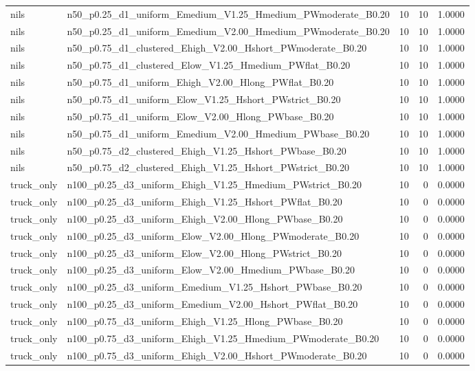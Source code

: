 \begin{tabular}{llrrr}
nils & n50_p0.25_d1_uniform_Emedium_V1.25_Hmedium_PWmoderate_B0.20 & 10 & 10 & 1.0000 \\
nils & n50_p0.25_d1_uniform_Emedium_V2.00_Hmedium_PWmoderate_B0.20 & 10 & 10 & 1.0000 \\
nils & n50_p0.75_d1_clustered_Ehigh_V2.00_Hshort_PWmoderate_B0.20 & 10 & 10 & 1.0000 \\
nils & n50_p0.75_d1_clustered_Elow_V1.25_Hmedium_PWflat_B0.20 & 10 & 10 & 1.0000 \\
nils & n50_p0.75_d1_uniform_Ehigh_V2.00_Hlong_PWflat_B0.20 & 10 & 10 & 1.0000 \\
nils & n50_p0.75_d1_uniform_Elow_V1.25_Hshort_PWstrict_B0.20 & 10 & 10 & 1.0000 \\
nils & n50_p0.75_d1_uniform_Elow_V2.00_Hlong_PWbase_B0.20 & 10 & 10 & 1.0000 \\
nils & n50_p0.75_d1_uniform_Emedium_V2.00_Hmedium_PWbase_B0.20 & 10 & 10 & 1.0000 \\
nils & n50_p0.75_d2_clustered_Ehigh_V1.25_Hshort_PWbase_B0.20 & 10 & 10 & 1.0000 \\
nils & n50_p0.75_d2_clustered_Ehigh_V1.25_Hshort_PWstrict_B0.20 & 10 & 10 & 1.0000 \\
truck_only & n100_p0.25_d3_uniform_Ehigh_V1.25_Hmedium_PWstrict_B0.20 & 10 & 0 & 0.0000 \\
truck_only & n100_p0.25_d3_uniform_Ehigh_V1.25_Hshort_PWflat_B0.20 & 10 & 0 & 0.0000 \\
truck_only & n100_p0.25_d3_uniform_Ehigh_V2.00_Hlong_PWbase_B0.20 & 10 & 0 & 0.0000 \\
truck_only & n100_p0.25_d3_uniform_Elow_V2.00_Hlong_PWmoderate_B0.20 & 10 & 0 & 0.0000 \\
truck_only & n100_p0.25_d3_uniform_Elow_V2.00_Hlong_PWstrict_B0.20 & 10 & 0 & 0.0000 \\
truck_only & n100_p0.25_d3_uniform_Elow_V2.00_Hmedium_PWbase_B0.20 & 10 & 0 & 0.0000 \\
truck_only & n100_p0.25_d3_uniform_Emedium_V1.25_Hshort_PWbase_B0.20 & 10 & 0 & 0.0000 \\
truck_only & n100_p0.25_d3_uniform_Emedium_V2.00_Hshort_PWflat_B0.20 & 10 & 0 & 0.0000 \\
truck_only & n100_p0.75_d3_uniform_Ehigh_V1.25_Hlong_PWbase_B0.20 & 10 & 0 & 0.0000 \\
truck_only & n100_p0.75_d3_uniform_Ehigh_V1.25_Hmedium_PWmoderate_B0.20 & 10 & 0 & 0.0000 \\
truck_only & n100_p0.75_d3_uniform_Ehigh_V2.00_Hshort_PWmoderate_B0.20 & 10 & 0 & 0.0000 \\

\end{tabular}
